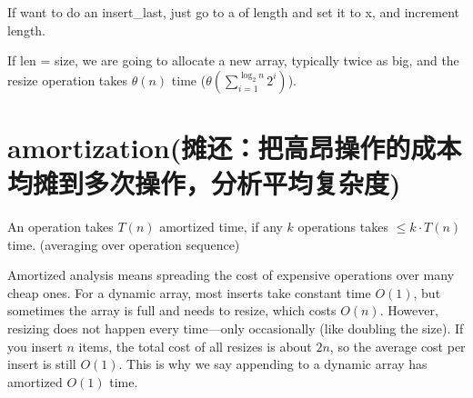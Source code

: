 \documentclass[10.5pt,hyperref,a4paper,UTF8]{ctexart}
\begin{document}

If want to do an insert\_last, just go to a of length and set it to x,
and increment length.

If len = size, we are going to allocate a new array, 
typically twice as big, and the resize operation takes $\theta(n)$ time ($\theta\left(\sum_{i=1}^{\log_{2} n} 2^i\right)$).

\section{amortization(摊还：把高昂操作的成本均摊到多次操作，分析平均复杂度)}
An operation takes $T(n)$ amortized time, if any $k$ operations takes $\leq k \cdot T(n)$ time.
(averaging over operation sequence)


Amortized analysis means spreading the cost of expensive operations over many cheap ones. 
For a dynamic array, most inserts take constant time $O(1)$, but sometimes the array is full and needs to resize, which costs $O(n)$. 
However, resizing does not happen every time---only occasionally (like doubling the size). 
If you insert $n$ items, the total cost of all resizes is about $2n$, so the average cost per insert is still $O(1)$. 
This is why we say appending to a dynamic array has amortized $O(1)$ time.
\end{document}
